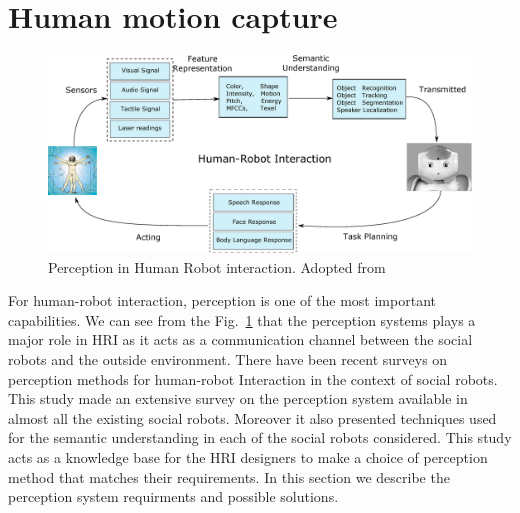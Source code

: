 \section{Human motion capture}
\label{sec:motion_capture}
\begin{figure}
\centering
\includegraphics[width=1\textwidth]{assets/hri_perception.eps}
\caption[Perception in Human Robot interaction]{Perception in Human Robot interaction. {Adopted from \cite{yan2014survey}}}
\label{fig:hri_perception}
\end{figure}
	For human-robot interaction, perception is one of the most important capabilities. We can see from the Fig.~\ref{fig:hri_perception} that the perception systems plays a major role in HRI as it acts as a communication channel between the social robots and the outside environment. There have been recent surveys on perception methods for human-robot Interaction in the context of social robots\cite{yan2014survey}. This study made an extensive survey on the perception system available in almost all the existing social robots. Moreover it also presented techniques used for the semantic understanding in each of the social robots considered. This study acts as a knowledge base for the HRI designers to make a choice of perception method that matches their requirements. In this section we describe the perception system requirments and possible solutions.
